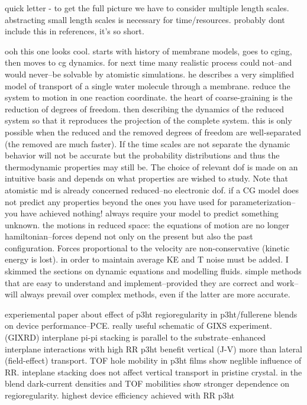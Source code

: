 \documentclass{article}
\begin{document}
\cite{Murtola2009a}

quick letter - to get the full picture we have to consider multiple length scales. abstracting small length scales is necessary for time/resources. probably dont include this in references, it's so short.

\cite{Berendsen2010}

ooh this one looks cool. starts with history of membrane models, goes to cging, then moves to cg dynamics. for next time
many realistic process could not--and would never--be solvable by atomistic simulations. he describes a very simplified model of transport of a single water molecule through a membrane. reduce the system to motion in one reaction coordinate.
the heart of coarse-graining is the reduction of degrees of freedom. then describing the dynamics of the reduced system so that it reproduces the projection of the complete system. this is only possible when the reduced and the removed degrees of freedom are well-separated (the removed are much faster). If the time scales are not separate the dynamic behavior will not be accurate but the probability distributions and thus the thermodynamic properties may still be.
The choice of relevant dof is made on an intuitive basis and depends on what properties are wished to study. Note that atomistic md is already concerned reduced--no electronic dof.
if a CG model does not predict any properties beyond the ones you have used for parameterization--you have achieved nothing! always require your model to predict something unknown.
the motions in reduced space: the equations of motion are no longer hamiltonian--forces depend not only on the present but also the past configuration. Forces proportional to the velocity are non-conservative (kinetic energy is lost). in order to maintain average KE and T noise must be added.
I skimmed the sections on dynamic equations and modelling fluids.
simple methods that are easy to understand and implement--provided they are correct and work--will always prevail over complex methods, even if the latter are more accurate.

\cite{Kim2006}

experiemental paper about effect of p3ht regioregularity in p3ht/fullerene blends on device performance--PCE.
really useful schematic of GIXS experiment. (GIXRD)
interplane pi-pi stacking is parallel to the substrate--enhanced interplane interactions with high RR p3ht benefit vertical (J-V) more than lateral (field-effect) transport. TOF hole mobility in p3ht films show neglible influence of RR. inteplane stacking does not affect vertical transport in pristine crystal. in the blend dark-current densities and TOF mobilities show stronger dependence on regioregularity. highest device efficiency achieved with RR p3ht
\end{document}
